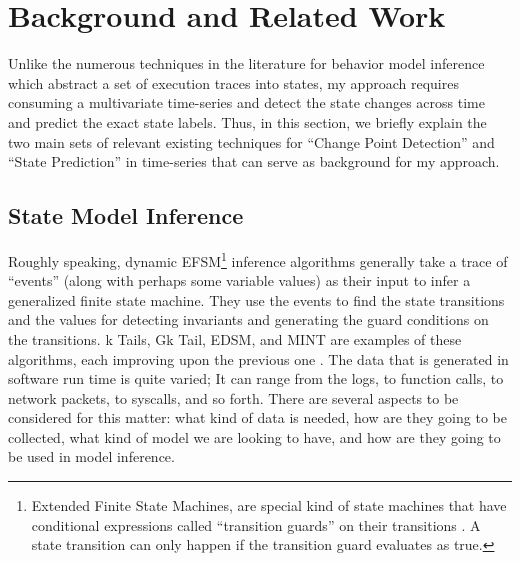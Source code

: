 \chapter{Background and Related Work} \label{sec:background}
Unlike the numerous techniques in the literature for behavior model inference \cite{lang1998results, walkinshaw2016inferring, Lo2007Mining, dallmeier2006mining} which abstract a set of execution traces into states, my approach requires consuming a multivariate time-series and detect the state changes across time and predict the exact state labels. Thus, in this section, we briefly explain the two main sets of relevant existing techniques for ``Change Point Detection'' and ``State Prediction'' in time-series that can serve as background for my approach.  

\section{State Model Inference}
Roughly speaking, dynamic EFSM\footnote{Extended Finite State Machines, are special kind of state machines that have conditional expressions called ``transition guards'' on their transitions \cite{lorenzoli2008automatic}. A state transition can only happen if the transition guard evaluates as true.} inference algorithms generally take a trace of ``events'' (along with perhaps some variable values) as their input \cite{walkinshaw2016inferring} to infer a generalized finite state machine. They use the events to find the state transitions and the values for detecting invariants and generating the guard conditions on the transitions. 
k Tails, Gk Tail, EDSM, and MINT are examples of these algorithms, each improving upon the previous one \cite{biermann1972synthesis, lorenzoli2008automatic, lang1998results, walkinshaw2016inferring}.  %
The data that is generated in software run time is quite varied; It can range from the logs, to function calls, to network packets, to syscalls, and so forth. There are several aspects to be considered for this matter: what kind of data is needed, how are they going to be collected, what kind of model we are looking to have, and how are they going to be used in model inference. 

